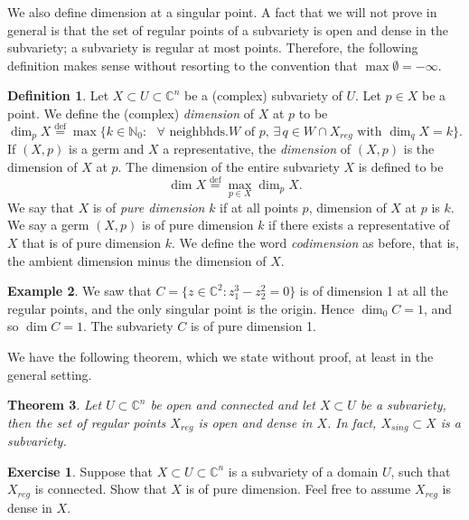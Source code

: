 \documentclass[12pt,openany]{book}
\newcommand{\C}{{\mathbb{C}}}
\newcommand{\N}{{\mathbb{N}}}
\newcommand{\myindex}[1]{#1\index{#1}}
\theoremstyle{plain}
\newtheorem{thm}{Theorem}[section]
\theoremstyle{remark}
\theoremstyle{definition}
\newtheorem{defn}[thm]{Definition}
\newenvironment{exbox}{%
    \def\FrameCommand{\vrule width 1pt \relax\hspace{10pt}}%
    \MakeFramed{\advance\hsize-\width\FrameRestore}%
}{%
    \endMakeFramed
}
\theoremstyle{exercise}
\newtheorem{exercise}{Exercise}[section]
\theoremstyle{example}
\newtheorem{example}[thm]{Example}
\begin{document}
We also define dimension at a singular point.
A fact that we will not prove in general is that
the set of regular points of a
subvariety is open and dense in the subvariety; a
subvariety is regular at most points.  Therefore, the
following definition makes sense without resorting to
the convention that $\max \emptyset = -\infty$.

\begin{defn}
Let $X \subset U \subset \C^n$ be a (complex) subvariety of $U$.  Let $p \in
X$ be a point.  We define the (complex)
\emph{\myindex{dimension}} of $X$ at $p$ to be
%
\begin{equation*}
\dim_p X \overset{\text{def}}{=}
\max \bigl\{ k \in \N_0 : \text{ $\forall$ neighbhds.
$W$ of $p$, $\exists \, q \in W \cap X_{\mathit{reg}}$ with $\dim_q X = k$}
\bigr\} .
\end{equation*}
If $(X,p)$ is a germ and $X$ a representative,
the \emph{dimension} of $(X,p)$ is the dimension of
$X$ at $p$.
The dimension of the entire subvariety $X$ is defined to be
%
\begin{equation*}
\dim X \overset{\text{def}}{=}
\max_{p \in X} \dim_p X .
\end{equation*}
We say that $X$ is of \emph{\myindex{pure dimension}} $k$ if at
all points $p$, dimension of $X$ at $p$ is $k$.
We say a germ $(X,p)$ is of pure dimension $k$ if there exists a representative
of $X$ that is of pure dimension $k$.
We define the word \emph{codimension} as before, that is, the
ambient dimension minus the dimension of $X$.
\end{defn}

\begin{example}
We saw that $C = \bigl\{ z \in \C^2 : z_1^3-z_2^2 = 0 \bigr\}$ is of
dimension 1 at all the regular points, and the only singular point is the
origin.  Hence $\dim_0 C = 1$, and so $\dim C = 1$.  The subvariety $C$ is
of pure dimension 1.
\end{example}


We have the following theorem, which we
state without proof, at least in the general setting.

\begin{thm}
Let $U \subset \C^n$ be open and connected and let $X \subset U$
be a subvariety, then the set of regular points $X_{\mathit{reg}}$
is open and dense in $X$.
In fact, $X_{\mathit{sing}} \subset X$ is a subvariety.
\end{thm}

\begin{exbox}
\begin{exercise}
Suppose that $X \subset U \subset \C^n$ is a subvariety
of a domain $U$, such that $X_{\mathit{reg}}$ is connected.  Show that $X$ is of
pure dimension.  Feel free to assume $X_{\mathit{reg}}$ is dense in $X$.
\end{exercise}
\end{exbox}
\end{document}
